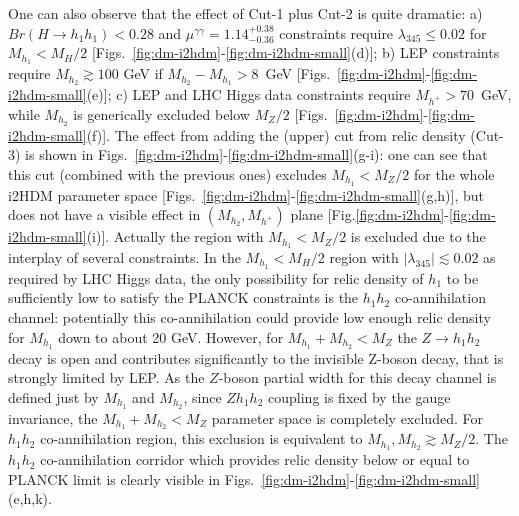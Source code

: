 \documentclass[12pt,a4paper]{article}
\begin{document}
One can also observe that the effect of Cut-1 plus Cut-2 is quite dramatic: a)
$Br(H\to h_1 h_1)<0.28$ and $\mu^{\gamma\gamma} = 1.14^{+0.38}_{-0.36}$ constraints
require $\lambda_{345}\leq 0.02$ for $M_{h_1}<M_H/2$
[Figs.~\ref{fig:dm-i2hdm}-\ref{fig:dm-i2hdm-small}(d)]; b) LEP constraints require $M_{h_2}\gtrsim 100$ GeV if 
$M_{h_2}-M_{h_1}>8$~GeV [Figs.~\ref{fig:dm-i2hdm}-\ref{fig:dm-i2hdm-small}(e)]; c) LEP and LHC Higgs data constraints 
require  $M_{h^+}>70$~GeV, while $M_{h_2}$ is generically excluded below $M_Z/2$ [Figs.~\ref{fig:dm-i2hdm}-\ref{fig:dm-i2hdm-small}(f)].
The effect from adding the (upper) cut from relic density (Cut-3)
is shown in Figs.~\ref{fig:dm-i2hdm}-\ref{fig:dm-i2hdm-small}(g-i): one can see that this cut
(combined with the previous ones)
excludes $M_{h_1}<M_Z/2$
for the whole i2HDM parameter space [Figs.~\ref{fig:dm-i2hdm}-\ref{fig:dm-i2hdm-small}(g,h)],
but does not have a visible effect in  $(M_{h_2},M_{h^{+}})$ plane [Fig.\ref{fig:dm-i2hdm}-\ref{fig:dm-i2hdm-small}(i)].
Actually the  region with $M_{h_1}<M_Z/2$ is excluded due to the interplay of several constraints.
In the  $M_{h_1}<M_H/2$ region with $|\lambda_{345}|\lesssim 0.02$ as required by LHC Higgs data,
the only possibility for relic density of $h_1$ to be sufficiently low to satisfy the PLANCK constraints
is the $h_1 h_2$ co-annihilation channel:
potentially this co-annihilation could provide low enough relic density 
for $M_{h_1}$ down to about 20 GeV. However,  for $M_{h_1}+M_{h_2}< M_Z$
the $Z\to h_1 h_2$ decay is open and contributes significantly to the invisible
Z-boson decay, that is strongly limited by LEP. As the $Z$-boson partial width for this decay channel
is defined just by $M_{h_1}$ and $M_{h_2}$, since $Z h_1 h_2$ coupling is fixed by the gauge invariance,
the $M_{h_1}+M_{h_2}< M_Z$ parameter space is completely excluded. 
For  $h_1 h_2$ co-annihilation region, this exclusion is equivalent to   $M_{h_1}, M_{h_2} \gtrsim M_Z/2$.
The $h_1 h_2$ co-annihilation corridor which provides relic density
below or equal to PLANCK limit is clearly visible in Figs.~\ref{fig:dm-i2hdm}-\ref{fig:dm-i2hdm-small}(e,h,k).
\end{document}
